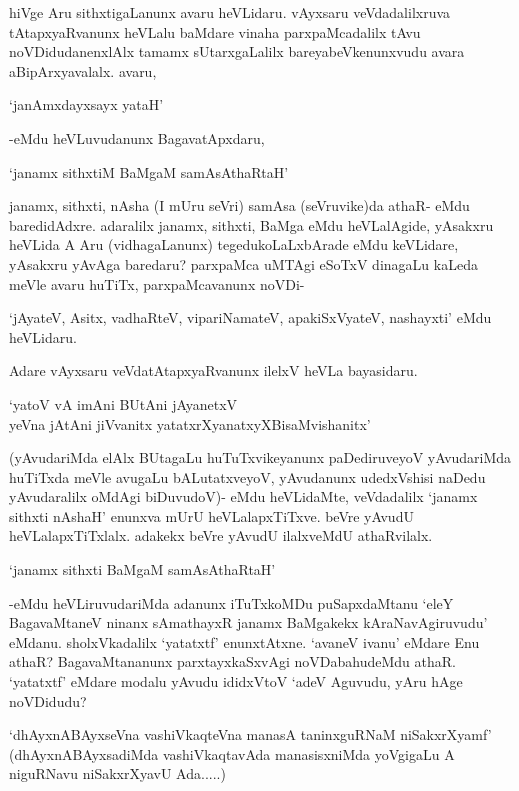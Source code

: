 hiVge Aru sithxtigaLanunx avaru heVLidaru. vAyxsaru veVdadalilxruva tAtapxyaRvanunx heVLalu baMdare vinaha parxpaMcadalilx tAvu noVDidudanenxlAlx tamamx sUtarxgaLalilx bareyabeVkenunxvudu avara aBipArxyavalalx. avaru,


\begin{shloka}
`janAmxdayxsayx yataH'
\end{shloka}

-eMdu heVLuvudanunx BagavatApxdaru,

\begin{shloka}
`janamx sithxtiM BaMgaM samAsAthaRtaH'
\end{shloka}

janamx, sithxti, nAsha (I mUru seVri) samAsa (seVruvike)da athaR- eMdu baredidAdxre. adaralilx janamx, sithxti, BaMga eMdu heVLalAgide, yAsakxru heVLida A Aru (vidhagaLanunx) tegedukoLaLxbArade eMdu keVLidare, yAsakxru yAvAga baredaru? parxpaMca uMTAgi eSoTxV dinagaLu kaLeda meVle avaru huTiTx, parxpaMcavanunx noVDi-

`jAyateV, Asitx, vadhaRteV, vipariNamateV, apakiSxVyateV, nashayxti' eMdu heVLidaru.

Adare vAyxsaru veVdatAtapxyaRvanunx ilelxV heVLa bayasidaru.

\begin{shloka}
`yatoV vA imAni BUtAni jAyanetxV\\
yeVna jAtAni jiVvanitx yatatxrXyanatxyXBisaMvishanitx'
\end{shloka}

(yAvudariMda elAlx BUtagaLu huTuTxvikeyanunx paDediruveyoV yAvudariMda huTiTxda meVle avugaLu bALutatxveyoV, yAvudanunx udedxVshisi naDedu yAvudaralilx oMdAgi biDuvudoV)- eMdu heVLidaMte, veVdadalilx `janamx sithxti nAshaH' enunxva mUrU heVLalapxTiTxve. beVre yAvudU heVLalapxTiTxlalx. adakekx beVre yAvudU ilalxveMdU athaRvilalx.

\begin{shloka}
`janamx sithxti BaMgaM samAsAthaRtaH'
\end{shloka}

-eMdu heVLiruvudariMda adanunx iTuTxkoMDu puSapxdaMtanu `eleY BagavaMtaneV ninanx sAmathayxR janamx BaMgakekx kAraNavAgiruvudu' eMdanu. sholxVkadalilx `yatatxtf' enunxtAtxne. `avaneV ivanu' eMdare Enu athaR? BagavaMtananunx parxtayxkaSxvAgi noVDabahudeMdu athaR. `yatatxtf' eMdare modalu yAvudu ididxVtoV `adeV Aguvudu, yAru hAge noVDidudu?

`dhAyxnABAyxseVna vashiVkaqteVna manasA taninxguRNaM niSakxrXyamf' (dhAyxnABAyxsadiMda vashiVkaqtavAda manasisxniMda yoVgigaLu A niguRNavu niSakxrXyavU Ada.....)

